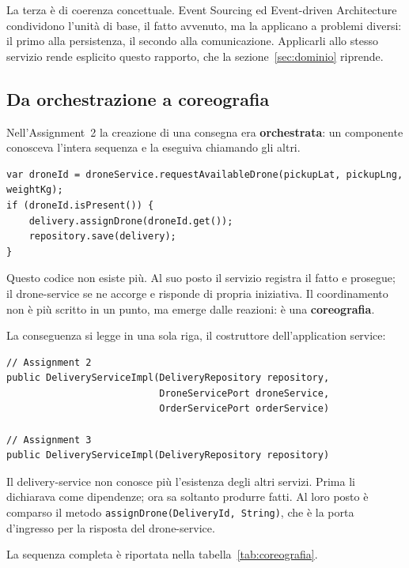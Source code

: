 \documentclass[12pt,a4paper]{article}
\begin{document}
La terza \`e di coerenza concettuale. Event Sourcing ed Event-driven Architecture condividono
l'unit\`a di base, il fatto avvenuto, ma la applicano a problemi diversi: il primo alla persistenza,
il secondo alla comunicazione. Applicarli allo stesso servizio rende esplicito questo rapporto,
che la sezione~\ref{sec:dominio} riprende.

\subsection{Da orchestrazione a coreografia}

Nell'Assignment~2 la creazione di una consegna era \textbf{orchestrata}: un componente conosceva
l'intera sequenza e la eseguiva chiamando gli altri.

\begin{lstlisting}[caption={Assignment 2: il servizio chiama il drone-service e attende}]
var droneId = droneService.requestAvailableDrone(pickupLat, pickupLng, weightKg);
if (droneId.isPresent()) {
    delivery.assignDrone(droneId.get());
    repository.save(delivery);
}
\end{lstlisting}

Questo codice non esiste pi\`u. Al suo posto il servizio registra il fatto e prosegue; il
drone-service se ne accorge e risponde di propria iniziativa. Il coordinamento non \`e pi\`u scritto in
un punto, ma emerge dalle reazioni: \`e una \textbf{coreografia}.

La conseguenza si legge in una sola riga, il costruttore dell'application service:

\begin{lstlisting}[caption={La firma che riassume l'intero punto 1}]
// Assignment 2
public DeliveryServiceImpl(DeliveryRepository repository,
                           DroneServicePort droneService,
                           OrderServicePort orderService)

// Assignment 3
public DeliveryServiceImpl(DeliveryRepository repository)
\end{lstlisting}

Il delivery-service non conosce pi\`u l'esistenza degli altri servizi. Prima li dichiarava come
dipendenze; ora sa soltanto produrre fatti. Al loro posto \`e comparso il metodo
\texttt{assignDrone(DeliveryId, String)}, che \`e la porta d'ingresso per la risposta del drone-service.

La sequenza completa \`e riportata nella tabella~\ref{tab:coreografia}.
\end{document}
